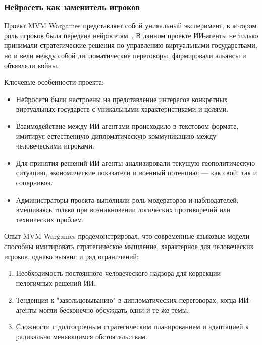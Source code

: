 \subsubsection{Нейросеть как заменитель игроков}

Проект MVM Wargames представляет собой уникальный эксперимент, в котором роль игроков была передана нейросетям~\cite{mvmwargames}. В данном проекте ИИ-агенты не только принимали стратегические решения по управлению виртуальными государствами, но и вели между собой дипломатические переговоры, формировали альянсы и объявляли войны.

Ключевые особенности проекта:

\begin{itemize}
    \item Нейросети были настроены на представление интересов конкретных виртуальных государств с уникальными характеристиками и целями.

    \item Взаимодействие между ИИ-агентами происходило в текстовом формате, имитируя естественную дипломатическую коммуникацию между человеческими игроками.

    \item Для принятия решений ИИ-агенты анализировали текущую геополитическую ситуацию, экономические показатели и военный потенциал — как свой, так и соперников.

    \item Администраторы проекта выполняли роль модераторов и наблюдателей, вмешиваясь только при возникновении логических противоречий или технических проблем.
\end{itemize}

Опыт MVM Wargames продемонстрировал, что современные языковые модели способны имитировать стратегическое мышление, характерное для человеческих игроков, однако выявил и ряд ограничений:

\begin{enumerate}
    \item Необходимость постоянного человеческого надзора для коррекции нелогичных решений ИИ.

    \item Тенденция к "закольцовыванию" в дипломатических переговорах, когда ИИ-агенты могли бесконечно обсуждать одни и те же темы.

    \item Сложности с долгосрочным стратегическим планированием и адаптацией к радикально меняющимся обстоятельствам.
\end{enumerate}

